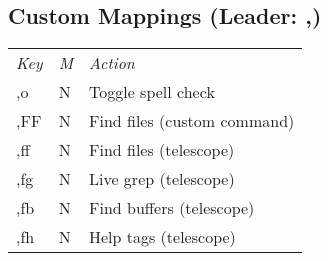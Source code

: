 \subsection{Custom Mappings (Leader: ,)}
	\begin{tabularx}{\tablewidth}{llX}
		\emph{Key} & \emph{M} & \emph{Action} \\
		,o         & N & Toggle spell check \\
		,FF        & N & Find files (custom command) \\
		,ff        & N & Find files (telescope) \\
		,fg        & N & Live grep (telescope) \\
		,fb        & N & Find buffers (telescope) \\
		,fh        & N & Help tags (telescope) \\
	\end{tabularx}

